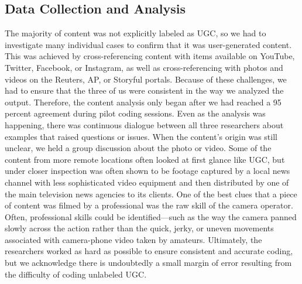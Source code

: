 \begin{enumerate}
\section{Data Collection and Analysis}
The majority of content was not explicitly labeled as UGC, so we had to
investigate many individual cases to confirm that it was user-generated content. This was achieved by cross-referencing content with items available on YouTube, Twitter, Facebook, or Instagram, as well as cross-referencing with photos and videos on the Reuters, AP, or Storyful portals. Because of these challenges, we had to ensure that the three of us were consistent in the way we analyzed the output. Therefore, the content analysis only began after we had reached a 95 percent agreement during pilot coding sessions. Even as the analysis was happening, there was continuous dialogue between all
three researchers about examples that raised questions or issues.
When the content's origin was still unclear, we held a group discussion
about the photo or video. Some of the content from more remote locations
often looked at first glance like UGC, but under closer inspection was often
shown to be footage captured by a local news channel with less sophisticated
video equipment and then distributed by one of the main television
news agencies to its clients. One of the best clues that a piece of content
was filmed by a professional was the raw skill of the camera operator. Often,
professional skills could be identified—such as the way the camera panned
slowly across the action rather than the quick, jerky, or uneven movements
associated with camera-phone video taken by amateurs. Ultimately, the
researchers worked as hard as possible to ensure consistent and accurate
coding, but we acknowledge there is undoubtedly a small margin of error
resulting from the difficulty of coding unlabeled UGC.


\end{enumerate}
